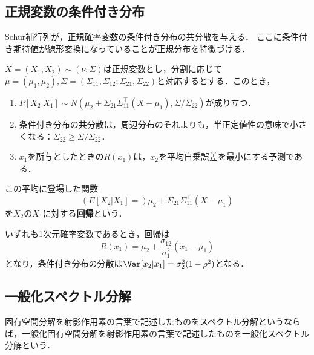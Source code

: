 \documentclass[uplatex, dvipdfmx]{jsreport}
\begin{document}
\subsection{正規変数の条件付き分布}

\begin{tcolorbox}[colframe=ForestGreen, colback=ForestGreen!10!white,breakable,colbacktitle=ForestGreen!40!white,coltitle=black,fonttitle=\bfseries\sffamily,
title=]
    Schur補行列が，正規確率変数の条件付き分布の共分散を与える．
    ここに条件付き期待値が線形変換になっていることが正規分布を特徴づける．
\end{tcolorbox}

\begin{proposition}
    $X=(X_1,X_2)\sim(\nu,\Sigma)$は正規変数とし，分割に応じて$\mu=(\mu_1,\mu_2),\Sigma=(\Sigma_{11},\Sigma_{12};\Sigma_{21},\Sigma_{22})$と対応するとする．このとき，
    \begin{enumerate}
        \item $P[X_2|X_1]\sim N(\mu_2+\Sigma_{21}\Sigma_{11}^\top(X-\mu_1),\Sigma/\Sigma_{22})$が成り立つ．
        \item 条件付き分布の共分散は，周辺分布のそれよりも，半正定値性の意味で小さくなる：$\Sigma_{22}\ge\Sigma/\Sigma_{22}$．
        \item $x_1$を所与としたときの$R(x_1)$は，$x_2$を平均自乗誤差を最小にする予測である．
    \end{enumerate}
\end{proposition}

\begin{definition}[regression]
    この平均に登場した関数
    \[(E[X_2|X_1]=)\mu_2+\Sigma_{21}\Sigma_{11}^\top(X-\mu_1)\]
    を$X_2$の$X_1$に対する\textbf{回帰}という．
\end{definition}
\begin{example}
    いずれも1次元確率変数であるとき，回帰は
    \[R(x_1)=\mu_2+\frac{\sigma_{12}}{\sigma_1^2}(x_1-\mu_1)\]
    となり，条件付き分布の分散は$\Var[x_2|x_1]=\sigma_2^2(1-\rho^2)$となる．
\end{example}

\subsection{一般化スペクトル分解}

\begin{tcolorbox}[colframe=ForestGreen, colback=ForestGreen!10!white,breakable,colbacktitle=ForestGreen!40!white,coltitle=black,fonttitle=\bfseries\sffamily,
title=]
    固有空間分解を射影作用素の言葉で記述したものをスペクトル分解というならば，一般化固有空間分解を射影作用素の言葉で記述したものを一般化スペクトル分解という．
\end{tcolorbox}
\end{document}
